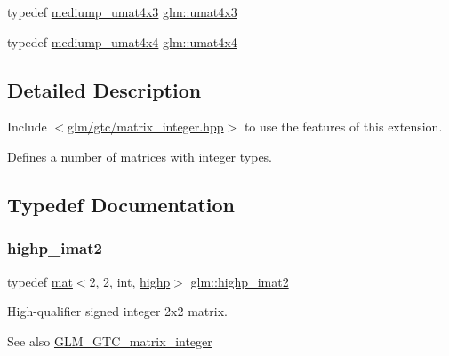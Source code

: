 \begin{DoxyCompactItemize}
\item 
typedef \mbox{\hyperlink{group__gtc__matrix__integer_ga974bc32af0686378c4696208c3103d96}{mediump\+\_\+umat4x3}} \mbox{\hyperlink{group__gtc__matrix__integer_ga08373f5588a54da1a48e5e55c7d51004}{glm\+::umat4x3}}
\item 
typedef \mbox{\hyperlink{group__gtc__matrix__integer_ga0dcca70aa643639489cf52acf7574e6c}{mediump\+\_\+umat4x4}} \mbox{\hyperlink{group__gtc__matrix__integer_gae0931b79e808fb0983848778a60eb548}{glm\+::umat4x4}}
\end{DoxyCompactItemize}


\subsection{Detailed Description}
Include $<$\mbox{\hyperlink{matrix__integer_8hpp}{glm/gtc/matrix\+\_\+integer.\+hpp}}$>$ to use the features of this extension.

Defines a number of matrices with integer types. 

\subsection{Typedef Documentation}
\mbox{\label{group__gtc__matrix__integer_ga5b3d41917c60488d2babd72ca26d01ba}} 
\subsubsection{\texorpdfstring{highp\+\_\+imat2}{highp\_imat2}}
{\footnotesize\ttfamily typedef \mbox{\hyperlink{structglm_1_1mat}{mat}}$<$2, 2, int, \mbox{\hyperlink{namespaceglm_a36ed105b07c7746804d7fdc7cc90ff25ac6f7eab42eacbb10d59a58e95e362074}{highp}}$>$ \mbox{\hyperlink{group__gtc__matrix__integer_ga5b3d41917c60488d2babd72ca26d01ba}{glm\+::highp\+\_\+imat2}}}

High-\/qualifier signed integer 2x2 matrix. \begin{DoxySeeAlso}{See also}
\mbox{\hyperlink{group__gtc__matrix__integer}{G\+L\+M\+\_\+\+G\+T\+C\+\_\+matrix\+\_\+integer}} 
\end{DoxySeeAlso}
\mbox{\label{group__gtc__matrix__integer_ga9d5c6c5a4640f7c794a77e3f60b91670}} 

